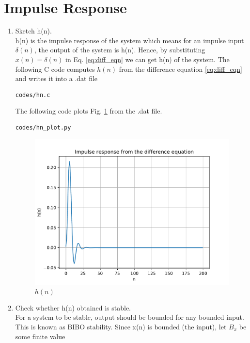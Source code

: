 \documentclass[journal,12pt,twocolumn]{IEEEtran}
\renewcommand\thesection{\arabic{section}}
\begin{document}
\section{Impulse Response}
\begin{enumerate}[label=\thesection.\arabic*,ref=\thesection.\theenumi]
\item
Sketch h(n).
\label{prob:h(n)}
\\
\solution
h(n) is the impulse response of the system which means for an impulse input $\delta(n)$, the output of the system is h(n). Hence, by substituting $x(n)= \delta(n)$ in Eq. \eqref{eq:diff_eqn} we can get h(n) of the system.
The following C code computes $h(n)$ from the difference equation \eqref{eq:diff_eqn} and writes it into a .dat file
\begin{lstlisting}
codes/hn.c
\end{lstlisting}
The following code plots Fig. \ref{fig:h(n)} from the .dat file.
\begin{lstlisting}
codes/hn_plot.py
\end{lstlisting}
\begin{figure}[!ht]
\centering
\includegraphics[width=\columnwidth]{./figs/hn}
\caption{$h(n)$}
\label{fig:h(n)}
\end{figure}
\item Check whether h(n) obtained is stable.
\\
\solution
For a system to be stable, output should be bounded for any bounded input. This is known as BIBO stability.
Since x(n) is bounded (the input), let $B_{x}$ be some finite value
\begin{equation}

\end{equation}
\end{enumerate}
\end{document}
